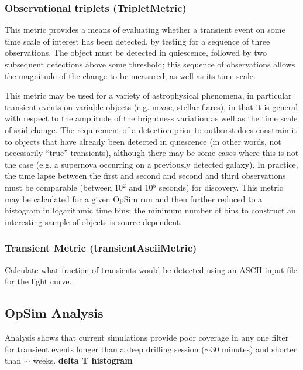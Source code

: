\subsubsection{Observational triplets (TripletMetric)}

This metric provides a means of evaluating whether a transient event
on some time scale of interest has been detected, by testing for a
sequence of three observations. The object must be detected in
quiescence, followed by two subsequent detections above some
threshold; this sequence of observations allows the magnitude of the
change to be measured, as well as its time scale.

This metric may be used for a variety of astrophysical phenomena, in
particular transient events on variable objects (e.g. novae, stellar
flares), in that it is general with respect to the amplitude of the
brightness variation as well as the time scale of said change. The
requirement of a detection prior to outburst does constrain it to
objects that have already been detected in quiescence (in other words,
not necessarily ``true'' transients), although there may be some cases
where this is not the case (e.g. a supernova occurring on a previously
detected galaxy). In practice, the time lapse between the first and
second and second and third observations must be comparable (between
10$^2$ and 10$^5$ seconds) for discovery. This metric may be
calculated for a given OpSim run and then further reduced to a
histogram in logarithmic time bins; the minimum number of bins to
construct an interesting sample of objects is source-dependent.

\subsubsection{Transient Metric (transientAsciiMetric)}

Calculate what fraction of transients would be detected using an ASCII
input file for the light curve.


\subsection{OpSim Analysis}
\label{sec:\chpname:analysis}

Analysis shows that current simulations provide  poor coverage in any one filter for transient events longer than a deep drilling session ($\sim$30 minutes) and shorter than $\sim$ weeks.
\textbf{delta T histogram}



